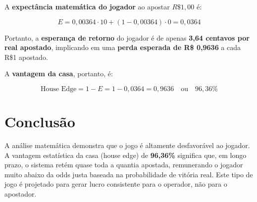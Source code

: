 \documentclass[a4paper,12pt]{article}
\begin{document}
A \textbf{expectância matemática do jogador} ao apostar $R\$1{,}00$ é:

\begin{equation}
E = 0{,}00364 \cdot 10 + (1 - 0{,}00364) \cdot 0 = 0{,}0364
\end{equation}

Portanto, a \textbf{esperança de retorno} do jogador é de apenas \textbf{3,64 centavos por real apostado}, implicando em uma \textbf{perda esperada de R\$ 0{,}9636} a cada R\$1 apostado.

A \textbf{vantagem da casa}, portanto, é:

\begin{equation}
\text{House Edge} = 1 - E = 1 - 0{,}0364 = 0{,}9636 \quad \text{ou} \quad 96{,}36\%
\end{equation}

\section*{Conclusão}

A análise matemática demonstra que o jogo é altamente desfavorável ao jogador. A vantagem estatística da casa (house edge) de \textbf{96,36\%} significa que, em longo prazo, o sistema retém quase toda a quantia apostada, remunerando o jogador muito abaixo da odds justa baseada na probabilidade de vitória real. Este tipo de jogo é projetado para gerar lucro consistente para o operador, não para o apostador.
\end{document}
